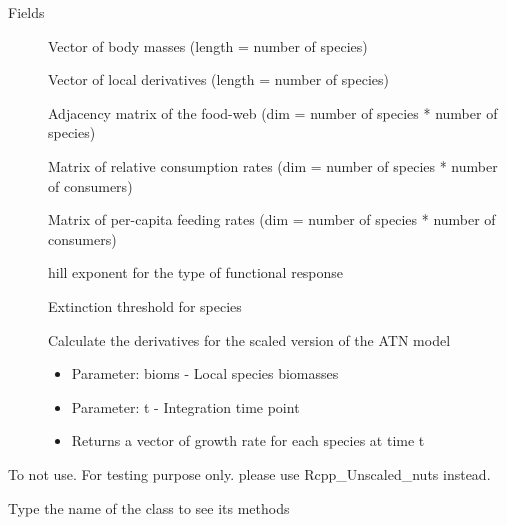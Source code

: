 \documentclass[letterpaper]{book}
\begin{document}
\begin{Section}{Fields}
\begin{description}
\item[] Vector of body masses (length = number of species)

\item[] Vector of local derivatives (length = number of species)

\item[] Adjacency matrix of the food-web (dim = number of species * number of species)

\item[] Matrix of relative consumption rates (dim = number of species * number of consumers)

\item[] Matrix of per-capita feeding rates (dim = number of species * number of consumers)

\item[] hill exponent for the type of functional response

\item[] Extinction threshold for species

\item[] Calculate the derivatives for the scaled version of the ATN model \begin{itemize}

\item{} Parameter: bioms -  Local species biomasses
\item{} Parameter: t - Integration time point
\item{} Returns a vector of growth rate for each species at time t

\end{itemize}


\end{description}
\end{Section}
%
\begin{Description}\relax
To not use. For testing purpose only. please use Rcpp\_Unscaled\_nuts instead.
\end{Description}
%
\begin{Description}\relax
Type the name of the class to see its methods
\end{Description}
%
\end{document}
